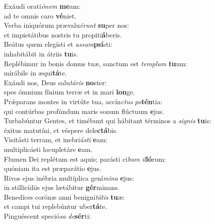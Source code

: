 \evenverse Exáudi orati\textit{ó}\textit{nem} \textbf{me}am:~\*\\
\evenverse ad te omnis caro \textbf{vé}niet.\\
\oddverse Verba iniquórum prævalu\textit{é}\textit{runt} \textbf{su}per nos:~\*\\
\oddverse et impietátibus nostris tu propiti\textbf{á}beris.\\
\evenverse Beátus quem elegísti et \textit{as}\textit{sum}\textbf{psí}sti:~\*\\
\evenverse inhabitábit in átriis \textbf{tu}is.\\
\oddverse Replébimur in bonis domus tuæ, sanctum est \textit{tem}\textit{plum} \textbf{tu}um:~\*\\
\oddverse mirábile in æqui\textbf{tá}te.\\
\evenverse Exáudi nos, Deus salu\textit{tá}\textit{ris} \textbf{no}ster:~\*\\
\evenverse spes ómnium fínium terræ et in mari \textbf{lon}ge.\\
\oddverse Prǽparans montes in virtúte tua, accín\textit{ctus} \textit{po}\textbf{tén}tia:~\*\\
\oddverse qui contúrbas profúndum maris sonum flúctuum \textbf{e}jus.\\
\evenverse Turbabúntur Gentes, et timébunt qui hábitant términos a \textit{si}\textit{gnis} \textbf{tu}is:~\*\\
\evenverse éxitus matutíni, et véspere dele\textbf{ctá}bis.\\
\oddverse Visitásti terram, et inebri\textit{á}\textit{sti} \textbf{e}am:~\*\\
\oddverse multiplicásti locupletáre \textbf{e}am.\\
\evenverse Flumen Dei replétum est aquis; parásti ci\textit{bum} \textit{il}\textbf{ló}rum:~\*\\
\evenverse quóniam ita est præparátio \textbf{e}jus.\\
\oddverse Rivos ejus inébria multíplica gení\textit{mi}\textit{na} \textbf{e}jus:~\*\\
\oddverse in stillicídiis ejus lætábitur \textbf{gér}minans.\\
\evenverse Benedíces corónæ anni benigni\textit{tá}\textit{tis} \textbf{tu}æ:~\*\\
\evenverse et campi tui replebúntur uber\textbf{tá}te.\\
\oddverse Pinguéscent speció\textit{sa} \textit{de}\textbf{sér}ti:~\*\\
